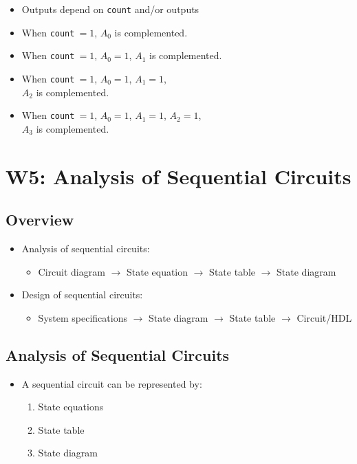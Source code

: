 \documentclass[a4paper]{article}
\begin{document}
\begin{minipage}[t]{0.5\textwidth}
\begin{itemize}
    \item Outputs depend on \texttt{count} and/or outputs
    \mbox{}\\
    \item When \texttt{count}$\ = 1$, $A_0$ is complemented.
    \item When \texttt{count}$\ = 1$, $A_0 = 1$, $A_1$ is complemented.
    \item When \texttt{count}$\ = 1$, $A_0 = 1$, $A_1 = 1$,\\ $A_2$ is complemented.
    \item When \texttt{count}$\ = 1$, $A_0 = 1$, $A_1 = 1$, $A_2 = 1$,\\ $A_3$ is complemented.
\end{itemize}
\end{minipage}

\newpage
\section{W5: Analysis of Sequential Circuits}

\subsection{Overview}
\begin{itemize}
    \item Analysis of sequential circuits:
    \begin{itemize}[label=$\circ$]
        \item Circuit diagram $\rightarrow$ State equation $\rightarrow$ State table $\rightarrow$ State diagram
    \end{itemize}
    \item Design of sequential circuits:
    \begin{itemize}[label=$\circ$]
        \item System specifications $\rightarrow$ State diagram $\rightarrow$ State table $\rightarrow$ Circuit/HDL
    \end{itemize}
\end{itemize}

\subsection{Analysis of Sequential Circuits}
\begin{itemize}
    \item A sequential circuit can be represented by:
    \begin{enumerate}
        \item State equations
        \item State table
        \item State diagram
    \end{enumerate}
\end{itemize}
\end{document}
